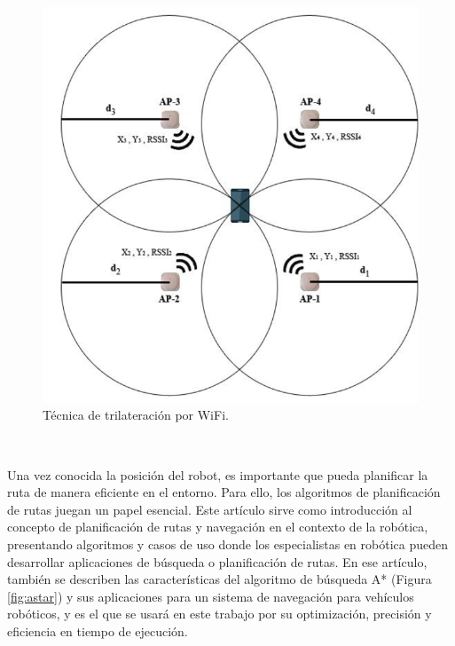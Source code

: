 \begin{figure} [H]
  \begin{center}
    \includegraphics[scale=0.4]{figs/trilateration}
  \end{center}
  \caption{Técnica de trilateración por WiFi.}
  \label{fig:trilateration}
\end{figure}\

Una vez conocida la posición del robot, es importante que pueda planificar la ruta de manera eficiente en el entorno. Para ello, los algoritmos de planificación de rutas juegan un papel esencial. Este artículo \cite{article} sirve como introducción al concepto de planificación de rutas y navegación en el contexto de la robótica, presentando algoritmos y casos de uso donde los especialistas en robótica pueden desarrollar aplicaciones de búsqueda o planificación de rutas. En ese artículo, también se describen las características del algoritmo de búsqueda A* (Figura \ref{fig:astar}) y sus aplicaciones para un sistema de navegación para vehículos robóticos, y es el que se usará en este trabajo por su optimización, precisión y eficiencia en tiempo de ejecución.

